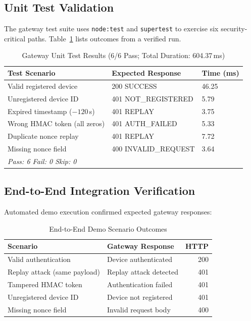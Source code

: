 \documentclass[conference]{IEEEtran}
\begin{document}
\subsection{Unit Test Validation}

The gateway test suite uses \texttt{node:test} and \texttt{supertest} to exercise six security-critical paths. Table~\ref{tab:unit} lists outcomes from a verified run.

\begin{table}[htbp]
\caption{Gateway Unit Test Results (6/6 Pass; Total Duration: 604.37\,ms)}
\label{tab:unit}
\centering
\begin{tabular}{p{3.8cm}p{2.0cm}p{1.5cm}}
\toprule
\textbf{Test Scenario} & \textbf{Expected Response} & \textbf{Time (ms)} \\
\midrule
Valid registered device         & 200 SUCCESS           & 46.25 \\
Unregistered device ID          & 401 NOT\_REGISTERED   & 5.79 \\
Expired timestamp ($-120$\,s)   & 401 REPLAY            & 3.75 \\
Wrong HMAC token (all zeros)    & 401 AUTH\_FAILED      & 5.33 \\
Duplicate nonce replay          & 401 REPLAY            & 7.72 \\
Missing nonce field             & 400 INVALID\_REQUEST  & 3.64 \\
\bottomrule
\multicolumn{3}{l}{\textit{Pass: 6 \quad Fail: 0 \quad Skip: 0}}
\end{tabular}
\end{table}

\subsection{End-to-End Integration Verification}

Automated demo execution confirmed expected gateway responses:

\begin{table}[htbp]
\caption{End-to-End Demo Scenario Outcomes}
\label{tab:demo}
\centering
\begin{tabular}{llr}
\toprule
\textbf{Scenario} & \textbf{Gateway Response} & \textbf{HTTP} \\
\midrule
Valid authentication            & Device authenticated      & 200 \\
Replay attack (same payload)    & Replay attack detected    & 401 \\
Tampered HMAC token             & Authentication failed     & 401 \\
Unregistered device ID          & Device not registered     & 401 \\
Missing nonce field             & Invalid request body      & 400 \\
\bottomrule
\end{tabular}
\end{table}
\end{document}
